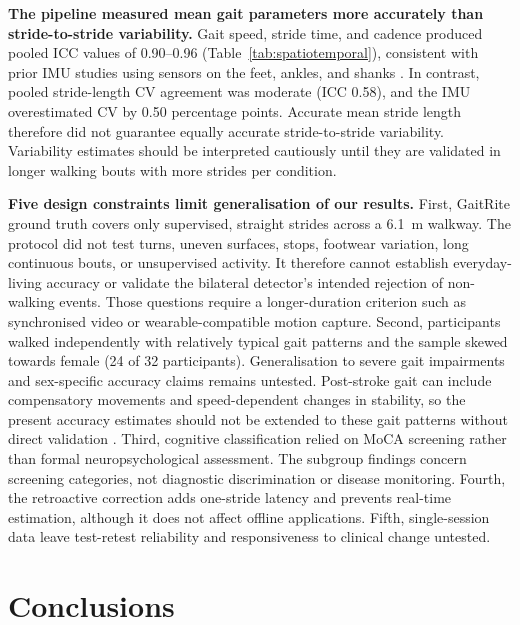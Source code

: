 \documentclass[fleqn,10pt,lineno]{wlpeerj}
\begin{document}
\textbf{The pipeline measured mean gait parameters more accurately than stride-to-stride variability.} Gait speed, stride time, and cadence produced pooled ICC values of 0.90--0.96 (Table~\ref{tab:spatiotemporal}), consistent with prior IMU studies using sensors on the feet, ankles, and shanks \citep{Trojaniello2014, Washabaugh2017}. In contrast, pooled stride-length CV agreement was moderate (ICC 0.58), and the IMU overestimated CV by 0.50 percentage points. Accurate mean stride length therefore did not guarantee equally accurate stride-to-stride variability. Variability estimates should be interpreted cautiously until they are validated in longer walking bouts with more strides per condition.

\textbf{Five design constraints limit generalisation of our results.} First, GaitRite ground truth covers only supervised, straight strides across a 6.1~m walkway. The protocol did not test turns, uneven surfaces, stops, footwear variation, long continuous bouts, or unsupervised activity. It therefore cannot establish everyday-living accuracy or validate the bilateral detector's intended rejection of non-walking events. Those questions require a longer-duration criterion such as synchronised video or wearable-compatible motion capture. Second, participants walked independently with relatively typical gait patterns and the sample skewed towards female (24 of 32 participants). Generalisation to severe gait impairments and sex-specific accuracy claims remains untested. Post-stroke gait can include compensatory movements and speed-dependent changes in stability, so the present accuracy estimates should not be extended to these gait patterns without direct validation \citep{Awad2017Compensations, Awad2023}. Third, cognitive classification relied on MoCA screening rather than formal neuropsychological assessment. The subgroup findings concern screening categories, not diagnostic discrimination or disease monitoring. Fourth, the retroactive correction adds one-stride latency and prevents real-time estimation, although it does not affect offline applications. Fifth, single-session data leave test-retest reliability and responsiveness to clinical change untested.


\clearpage
\section{Conclusions}
\end{document}
